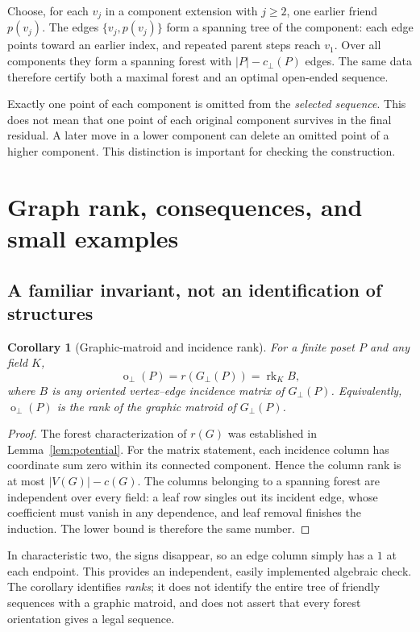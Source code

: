 \documentclass[11pt,a4paper]{article}
\newtheorem{corollary}[theorem]{Corollary}
\theoremstyle{definition}
\theoremstyle{remark}
\newcommand{\fot}{\operatorname{o}_{\perp}}
\newcommand{\incg}{G_{\perp}}
\newcommand{\cc}{c_{\perp}}
\newcommand{\rk}{\operatorname{rk}}
\begin{document}
Choose, for each $v_j$ in a component extension with $j\ge2$, one earlier
friend $p(v_j)$. The edges $\{v_j,p(v_j)\}$ form a spanning tree of the
component: each edge points toward an earlier index, and repeated parent
steps reach $v_1$. Over all components they form a spanning forest with
$|P|-\cc(P)$ edges. The same data therefore certify both a maximal forest
and an optimal open-ended sequence.

Exactly one point of each component is omitted from the \emph{selected
sequence}. This does not mean that one point of each original component
survives in the final residual. A later move in a lower component can delete
an omitted point of a higher component. This distinction is important for
checking the construction.

\section{Graph rank, consequences, and small examples}

\subsection{A familiar invariant, not an identification of structures}

\begin{corollary}[Graphic-matroid and incidence rank]\label{cor:matroid}
For a finite poset $P$ and any field $K$,
\[
 \fot(P)=r(\incg(P))=\rk_K B,
\]
where $B$ is any oriented vertex--edge incidence matrix of $\incg(P)$.
Equivalently, $\fot(P)$ is the rank of the graphic matroid of $\incg(P)$.
\end{corollary}

\begin{proof}
The forest characterization of $r(G)$ was established in
Lemma~\ref{lem:potential}. For the matrix statement, each incidence column
has coordinate sum zero within its connected component. Hence the column
rank is at most $|V(G)|-c(G)$. The columns belonging to a spanning forest
are independent over every field: a leaf row singles out its incident edge,
whose coefficient must vanish in any dependence, and leaf removal finishes
the induction. The lower bound is therefore the same number.
\end{proof}

In characteristic two, the signs disappear, so an edge column simply has
a $1$ at each endpoint. This provides an independent, easily implemented
algebraic check. The corollary identifies \emph{ranks}; it does not identify
the entire tree of friendly sequences with a graphic matroid, and does not
assert that every forest orientation gives a legal sequence.
\end{document}
